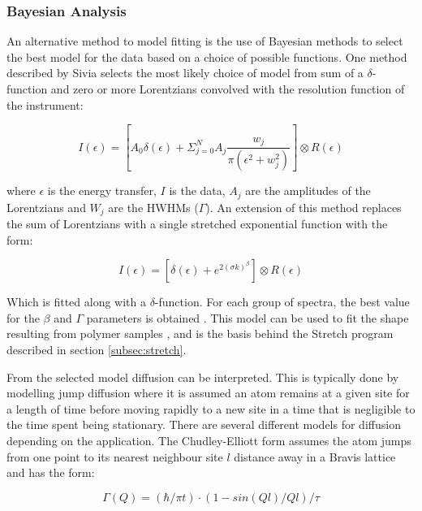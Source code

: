 \documentclass[paper=a4, fontsize=11pt]{scrartcl}	%
\numberwithin{equation}{section}															%
\numberwithin{figure}{section}																%
\numberwithin{table}{section}																%
\begin{document}
\subsubsection{Bayesian Analysis}
An alternative method to model fitting is the use of Bayesian methods to select the best model for the data based on a choice of possible functions. One method described by Sivia \cite{dssivia1992} selects the most likely choice of model from sum of a $\delta$-function and zero or more Lorentzians convolved with the resolution function of the instrument: 

\begin{equation}
I(\epsilon) = [A_0\delta(\epsilon) + \Sigma_{j=0}^N A_j \frac{w_j}{\pi(\epsilon^2 + w_j^2)}] \otimes R(\epsilon)
\end{equation}

where $\epsilon$ is the energy transfer, $I$ is the data, $A_j$ are the amplitudes of the Lorentzians and $W_j$ are the HWHMs ($\Gamma$). An extension of this method replaces the sum of Lorentzians with a single stretched exponential function with the form:

\begin{equation}
I(\epsilon) = [\delta(\epsilon) + e^{2(\sigma k)^\beta}] \otimes R(\epsilon)
\end{equation}

Which is fitted along with a $\delta$-function. For each group of spectra, the best value for the $\beta$ and $\Gamma$ parameters is obtained \cite{wshowells2010}. This model can be used to fit the shape resulting from polymer samples \cite{wshowells1996}\cite{higgins1977observation}\cite{higgins1977q},  and is the basis behind the Stretch program described in section \ref{subsec:stretch}.

From the selected model diffusion can be interpreted. This is typically done by modelling jump diffusion where it is assumed an atom remains at a given site for a length of time before moving rapidly to a new site in a time that is negligible to the time spent being stationary. There are several different models for diffusion depending on the application. The Chudley-Elliott form assumes the atom jumps from one point to its nearest neighbour site $l$ distance away in a Bravis lattice \cite{chudley1961neutron} and has the form:

\begin{equation}
\Gamma(Q) = (\hbar/\pi t) \cdot (1 - sin(Ql)/Ql)/\tau
\end{equation}
\end{document}
